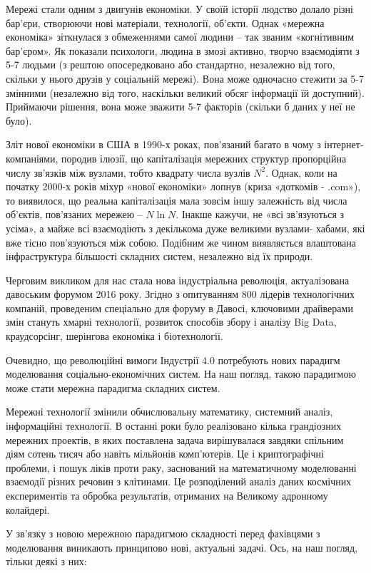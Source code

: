 \documentclass[
  letterpaper,
]{report}
\begin{document}
Мережі стали одним з двигунів економіки. У своїй історії людство долало
різні бар'єри, створюючи нові матеріали, технології, об'єкти. Однак
«мережна економіка» зіткнулася з обмеженнями самої людини -- так званим
«когнітивним бар'єром». Як показали психологи, людина в змозі активно,
творчо взаємодіяти з 5-7 людьми (з рештою опосередковано або стандартно,
незалежно від того, скільки у нього друзів у соціальній мережі). Вона
може одночасно стежити за 5-7 змінними (незалежно від того, наскільки
великий обсяг інформації їй доступний). Приймаючи рішення, вона може
зважити 5-7 факторів (скільки б даних у неї не було).

Зліт нової економіки в США в 1990-х роках, пов'язаний багато в чому з
інтернет- компаніями, породив ілюзії, що капіталізація мережних структур
пропорційна числу зв'язків між вузлами, тобто квадрату числа вузлів
\(N^2\). Однак, коли на початку 2000-х років міхур «нової економіки»
лопнув (криза «доткомів - .com»), то виявилося, що реальна капіталізація
мала зовсім іншу залежність від числа об'єктів, пов'язаних мережею --
\(N\ln{N}\). Інакше кажучи, не «всі зв'язуються з усіма», а майже всі
взаємодіють з декількома дуже великими вузлами- хабами, які вже тісно
пов'язуються між собою. Подібним же чином виявляється влаштована
інфраструктура більшості складних систем, незалежно від їх природи.

Черговим викликом для нас стала нова індустріальна революція,
актуалізована давоським форумом 2016 року. Згідно з опитуванням 800
лідерів технологічних компаній, проведеним спеціально для форуму в
Давосі, ключовими драйверами змін стануть хмарні технології, розвиток
способів збору і аналізу Big Data, краудсорсінг, шерінгова економіка і
біотехнології.

Очевидно, що революційні вимоги Індустрії 4.0 потребують нових парадигм
моделювання соціально-економічних систем. На наш погляд, такою
парадигмою може стати мережна парадигма складних систем.

Мережні технології змінили обчислювальну математику, системний аналіз,
інформаційні технології. В останні роки було реалізовано кілька
грандіозних мережних проектів, в яких поставлена задача вирішувалася
завдяки спільним діям сотень тисяч або навіть мільйонів комп'ютерів. Це
і криптографічні проблеми, і пошук ліків проти раку, заснований на
математичному моделюванні взаємодії різних речовин з клітинами. Це
розподілений аналіз даних космічних експериментів та обробка
результатів, отриманих на Великому адронному колайдері.

У зв'язку з новою мережною парадигмою складності перед фахівцями з
моделювання виникають принципово нові, актуальні задачі. Ось, на наш
погляд, тільки деякі з них:
\end{document}
